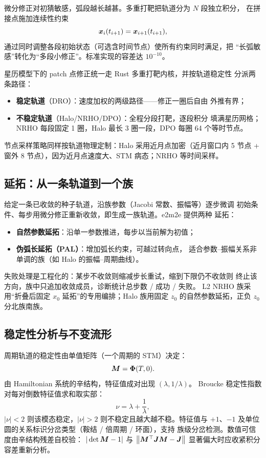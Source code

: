 微分修正对初猜敏感，弧段越长越甚。多重打靶把轨道分为 $N$ 段独立积分，
在拼接点施加连续性约束
\begin{equation}
  \bm{x}_i(t_{i+1}) = \bm{x}_{i+1}(t_{i+1}),
\end{equation}
通过同时调整各段初始状态（可选含时间节点）使所有约束同时满足，把
“长弧敏感”转化为“多段小修正”。标准实现的容差达 $10^{-10}$。

星历模型下的 patch 点修正统一走 Rust 多重打靶内核，并按轨道稳定性
分派两条路径：

\begin{itemize}
  \item \textbf{稳定轨道}（DRO）：速度加权的两级路径——修正一圈后自由
        外推有界；
  \item \textbf{不稳定轨道}（Halo/NRHO/DPO）：全程分段打靶，逐段积分
        填满星历网格；NRHO 每段固定 1 圈，Halo 最长 3 圈一段，DPO
        每圈 64 个等时节点。
\end{itemize}

节点采样策略同样按轨道物理定制：Halo 采用近月点加密（近月窗口内
5 节点 + 窗外 8 节点），因为近月点速度大、STM 病态；NRHO 等时间采样。

\subsection{延拓：从一条轨道到一个族}

给定一条已收敛的种子轨道，沿族参数（Jacobi 常数、振幅等）逐步微调
初始条件、每步用微分修正重新收敛，即生成一族轨道。e2m2e 提供两种
延拓：

\begin{itemize}
  \item \textbf{自然参数延拓}：沿单一参数推进，每步以当前解为初值；
  \item \textbf{伪弧长延拓（PAL）}：增加弧长约束，可越过转向点，
        适合参数--振幅关系非单调的族（如 Halo 的振幅--周期曲线）。
\end{itemize}

失败处理是工程化的：某步不收敛则缩减步长重试，缩到下限仍不收敛则
终止该方向，族中只追加收敛成员，诊断统计总步数 / 成功 / 失败。
L2 NRHO 族采用“折叠后固定 $x_0$ 延拓”的专用编排；Halo 族用固定
$z_0$ 的自然参数延拓，正负 $z_0$ 分北族南族。

\subsection{稳定性分析与不变流形}

周期轨道的稳定性由单值矩阵（一个周期的 STM）决定：
\begin{equation}
  \bm{M} = \bm{\Phi}(T, 0).
\end{equation}
由 Hamiltonian 系统的辛结构，特征值成对出现 $(\lambda, 1/\lambda)$。
Broucke 稳定性指数对每对倒数特征值求和取实部：
\begin{equation}
  \nu = \lambda + \frac{1}{\lambda},
\end{equation}
$|\nu| < 2$ 则该模态稳定，$|\nu| > 2$ 则不稳定且越大越不稳。特征值与
$+1$、$-1$ 及单位圆的关系标识分岔类型（鞍结 / 倍周期 / 环面），支持
族级分岔检测。数值可信度由辛结构残差自校验：
$|\det \bm{M} - 1|$ 与 $\left\lVert \bm{M}^\top \bm{J} \bm{M} - \bm{J} \right\rVert$
显著偏大时应收紧积分容差重新分析。

